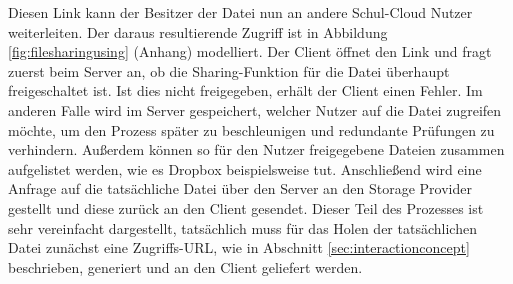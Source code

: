 Diesen Link kann der Besitzer der Datei nun an andere Schul-Cloud Nutzer weiterleiten. Der daraus resultierende Zugriff ist in Abbildung \ref{fig:filesharingusing} (Anhang) modelliert. Der Client öffnet den Link und fragt zuerst beim Server an, ob die Sharing-Funktion für die Datei überhaupt freigeschaltet ist. Ist dies nicht freigegeben, erhält der Client einen Fehler. Im anderen Falle wird im Server gespeichert, welcher Nutzer auf die Datei zugreifen möchte, um den Prozess später zu beschleunigen und redundante Prüfungen zu verhindern. Außerdem können so für den Nutzer freigegebene Dateien zusammen aufgelistet werden, wie es Dropbox beispielsweise tut. Anschließend wird eine Anfrage auf die tatsächliche Datei über den Server an den Storage Provider gestellt und diese zurück an den Client gesendet. Dieser Teil des Prozesses ist sehr vereinfacht dargestellt, tatsächlich muss für das Holen der tatsächlichen Datei zunächst eine Zugriffs-URL, wie in Abschnitt \ref{sec:interactionconcept} beschrieben, generiert und an den Client geliefert werden.

\clearpage
